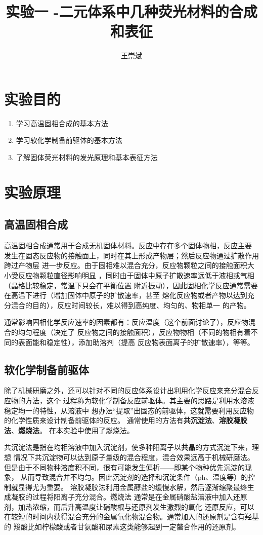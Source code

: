 \documentclass[a4paper,zihao=5,UTF8]{ctexart}
\title{\textbf{实验一 \ce{SrO}-\ce{Al2O3}二元体系中几种荧光材料的合成和表征\cite{inorganic_chemistry_1}}}
\author{王崇斌\;1800011716}
\begin{document}
	\pagestyle{fancy}
	\pagestyle{fancy}
	\chead{}
	\rhead{\today}
	\maketitle
    \thispagestyle{fancy}
	\section{实验目的}
	\begin{enumerate}
		\item 学习高温固相合成的基本方法
		\item 学习软化学制备前驱体的基本方法
		\item 了解固体荧光材料的发光原理和基本表征方法
	\end{enumerate}
	\section{实验原理}
	\subsection{高温固相合成}
	高温固相合成通常用于合成无机固体材料。反应中存在多个固体物相，反应主要
	发生在固态反应物的接触面上，同时在其上形成产物层；然后反应物通过扩散作用跨过产物层
	进一步反应。由于固相难以混合充分，反应物颗粒之间的接触面积大小受反应物颗粒直径影响明显
	，同时由于固体中原子扩散速率远低于液相或气相（晶格比较稳定，常温下只会在平衡位置
	附近振动），因此固相化学反应通常需要在高温下进行（增加固体中原子的扩散速率，甚至
	熔化反应物或者产物以达到充分混合的目的），反应时间较长，难以得到高纯度、均匀的、物相单一
	的产物。
	\par 
	通常影响固相化学反应速率的因素都有：反应温度（这个前面讨论了），反应物混合的均匀程度（决定了
	反应物之间的接触面积），反应物物相（不同的物相有着不同的表面能和稳定性），添加助溶剂（提高
	反应物表面离子的扩散速率），等等。
	\subsection{软化学制备前驱体}
	除了机械研磨之外，还可以针对不同的反应体系设计出利用化学反应来充分混合反应物的方法，这个
	过程称为软化学制备反应前驱体。其主要的思路是利用水溶液稳定均一的特性，从溶液中
	想办法“提取”出固态的前驱体，这就需要利用反应物的化学性质来设计制备前驱体的反应。
	通常使用的方法有\textbf{共沉淀法}、\textbf{溶胶凝胶法}、\textbf{燃烧法}。
	在本实验中使用了燃烧法。
	\par 共沉淀法是指在均相溶液中加入沉淀剂，使多种阳离子以\textbf{共晶}的方式沉淀下来，理想
	情况下共沉淀物可以达到原子量级的混合程度，混合效果远高于机械研磨法。
	但是由于不同物种溶度积不同，很有可能发生偏析——即某个物种优先沉淀的现象，
	从而导致混合并不均匀。因此沉淀剂的选择和沉淀条件（ph、温度等）的控制就显得尤为重要。
	溶胶凝胶法利用金属醇盐的缓慢水解，然后逐渐缩聚最终生成凝胶的过程将阳离子充分混合。燃烧法
	通常是在金属硝酸盐溶液中加入还原剂，加热浓缩，而后升高温度让硝酸根与还原剂发生激烈的氧化
	还原反应，可以在较短的时间内获得混合充分的金属氧化物混合物。通常加入的还原剂是含有羟基的
	羧酸比如柠檬酸或者甘氨酸和尿素这类能够起到一定螯合作用的还原剂。
\end{document}
